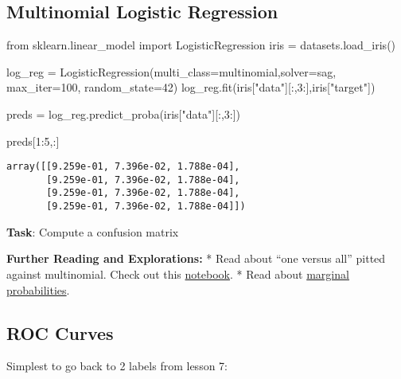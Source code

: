 \documentclass[
  letterpaper,
  DIV=11,
  numbers=noendperiod]{scrreprt}
\newenvironment{Shaded}{\begin{snugshade}}{\end{snugshade}}
\newcommand{\DecValTok}[1]{\textcolor[rgb]{0.68,0.00,0.00}{#1}}
\newcommand{\ImportTok}[1]{\textcolor[rgb]{0.00,0.46,0.62}{#1}}
\newcommand{\NormalTok}[1]{\textcolor[rgb]{0.00,0.23,0.31}{#1}}
\newcommand{\OperatorTok}[1]{\textcolor[rgb]{0.37,0.37,0.37}{#1}}
\newcommand{\StringTok}[1]{\textcolor[rgb]{0.13,0.47,0.30}{#1}}
\begin{document}
\hypertarget{multinomial-logistic-regression-1}{%
\subsection{Multinomial Logistic
Regression}\label{multinomial-logistic-regression-1}}

\begin{Shaded}
\begin{Highlighting}[]
\ImportTok{from}\NormalTok{ sklearn.linear\_model }\ImportTok{import}\NormalTok{ LogisticRegression}
\NormalTok{iris }\OperatorTok{=}\NormalTok{ datasets.load\_iris()}

\NormalTok{log\_reg }\OperatorTok{=}\NormalTok{ LogisticRegression(multi\_class}\OperatorTok{=}\StringTok{\textquotesingle{}multinomial\textquotesingle{}}\NormalTok{,solver}\OperatorTok{=}\StringTok{\textquotesingle{}sag\textquotesingle{}}\NormalTok{, max\_iter}\OperatorTok{=}\DecValTok{100}\NormalTok{, random\_state}\OperatorTok{=}\DecValTok{42}\NormalTok{)}
\NormalTok{log\_reg.fit(iris[}\StringTok{"data"}\NormalTok{][:,}\DecValTok{3}\NormalTok{:],iris[}\StringTok{"target"}\NormalTok{])}
    
\NormalTok{preds }\OperatorTok{=}\NormalTok{ log\_reg.predict\_proba(iris[}\StringTok{"data"}\NormalTok{][:,}\DecValTok{3}\NormalTok{:])}

\NormalTok{preds[}\DecValTok{1}\NormalTok{:}\DecValTok{5}\NormalTok{,:]}
\end{Highlighting}
\end{Shaded}

\begin{verbatim}
array([[9.259e-01, 7.396e-02, 1.788e-04],
       [9.259e-01, 7.396e-02, 1.788e-04],
       [9.259e-01, 7.396e-02, 1.788e-04],
       [9.259e-01, 7.396e-02, 1.788e-04]])
\end{verbatim}

\textbf{Task}: Compute a confusion matrix

\textbf{Further Reading and Explorations:} * Read about ``one versus
all'' pitted against multinomial. Check out this
\href{plot_logistic_multinomial.ipynb}{notebook}. * Read about
\href{http://data.princeton.edu/wws509/stata/mlogit.html}{marginal
probabilities}.

\hypertarget{roc-curves-1}{%
\subsection{ROC Curves}\label{roc-curves-1}}

Simplest to go back to 2 labels from lesson 7:
\end{document}
